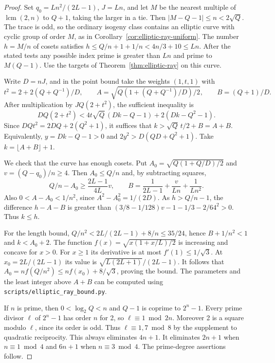 \documentclass[11pt]{article}
\begin{document}
\begin{proof}
Set \(q_0=Ln^2/(2L-1)\), \(J=Ln\), and let \(M\) be the nearest
multiple of \(\operatorname{lcm}(2,n)\) to \(Q+1\), taking the larger
in a tie. Then \(|M-Q-1|\le n<2\sqrt Q\). The trace is odd, so the
ordinary isogeny class contains an elliptic curve with cyclic group
of order \(M\), as in Corollary~\ref{cor:elliptic-ray-uniform}.
The number \(h=M/n\) of cosets satisfies
\(h\le Q/n+1+1/n<4n/3+10\le Ln\).
After the stated tests any possible index prime is greater than \(Ln\)
and prime to \(M(Q-1)\). Use the targets of Theorem~\ref{thm:elliptic-ray}
on this curve.

Write \(D=nJ\), and in the point bound take the weights \((1,t,1)\) with
\[
 t^2=2+2(Q+Q^{-1})/D,\qquad
 A=\sqrt{Q(1+(Q+Q^{-1})/D)/2},\qquad B=(Q+1)/D.
\]
After multiplication by \(JQ(2+t^2)\), the sufficient inequality is
\[
 DQ(2+t^2)<4t\sqrt Q\,(Dk-Q-1)+2(Dk-Q^2-1).
\]
Since \(DQt^2=2DQ+2(Q^2+1)\), it suffices that
\(k>\sqrt Q\,t/2+B=A+B\). Equivalently,
\(y=Dk-Q-1>0\) and \(2y^2>D(QD+Q^2+1)\).
Take \(k=\lfloor A+B\rfloor+1\).

We check that the curve has enough cosets. Put
\(A_0=\sqrt{Q(1+Q/D)/2}\) and \(v=(Q-q_0)/n\ge4\).
Then \(A_0\le Q/n\) and, by subtracting squares,
\[
 Q/n-A_0\ge\frac{2L-1}{4L}v,\qquad
 B=\frac1{2L-1}+\frac v{Ln}+\frac1{Ln^2}.
\]
Also \(0<A-A_0<1/n^2\), since \(A^2-A_0^2=1/(2D)\).
As \(h>Q/n-1\), the difference \(h-A-B\) is greater than
\((3/8-1/128)v-1-1/3-2/64^2>0\). Thus \(k\le h\).

For the length bound, \(Q/n^2<2L/(2L-1)+8/n\le35/24\), hence
\(B+1/n^2<1\) and \(k<A_0+2\). The function
\(f(x)=\sqrt{x(1+x/L)/2}\) is increasing and concave for \(x>0\).
For \(x\ge1\) its derivative is at most \(f'(1)\le1/\sqrt3\).
At \(x_0=2L/(2L-1)\) its value is \(\sqrt{L(2L+1)}/(2L-1)\).
It follows that \(A_0=n f(Q/n^2)\le n f(x_0)+8/\sqrt3\), proving
the bound. The parameters and the least integer above \(A+B\)
can be computed using \nolinkurl{scripts/elliptic_ray_bound.py}.

If \(n\) is prime, then \(0<\log_2Q<n\) and \(Q-1\) is coprime to
\(2^n-1\). Every prime divisor \(\ell\) of \(2^n-1\) has order \(n\)
for 2, so \(\ell\equiv1\bmod 2n\). Moreover 2 is a square modulo
\(\ell\), since its order is odd. Thus \(\ell\equiv1,7\bmod8\) by
the supplement to quadratic reciprocity. This always eliminates
\(4n+1\). It eliminates \(2n+1\) when \(n\equiv1\bmod4\) and
\(6n+1\) when \(n\equiv3\bmod4\). The prime-degree assertions follow.
\end{proof}
\end{document}
